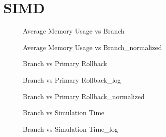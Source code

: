 \section{SIMD}
\begin{figure}[H]
\centering

\caption{Average Memory Usage vs Branch}
\end{figure}
\vspace{1cm}
\begin{figure}[H]
\centering

\caption{Average Memory Usage vs Branch\_normalized}
\end{figure}
\vspace{1cm}
\newpage
\begin{figure}[H]
\centering

\caption{Branch vs Primary Rollback}
\end{figure}
\vspace{1cm}
\begin{figure}[H]
\centering

\caption{Branch vs Primary Rollback\_log}
\end{figure}
\vspace{1cm}
\newpage
\begin{figure}[H]
\centering

\caption{Branch vs Primary Rollback\_normalized}
\end{figure}
\vspace{1cm}
\begin{figure}[H]
\centering

\caption{Branch vs Simulation Time}
\end{figure}
\vspace{1cm}
\newpage
\begin{figure}[H]
\centering

\caption{Branch vs Simulation Time\_log}
\end{figure}
